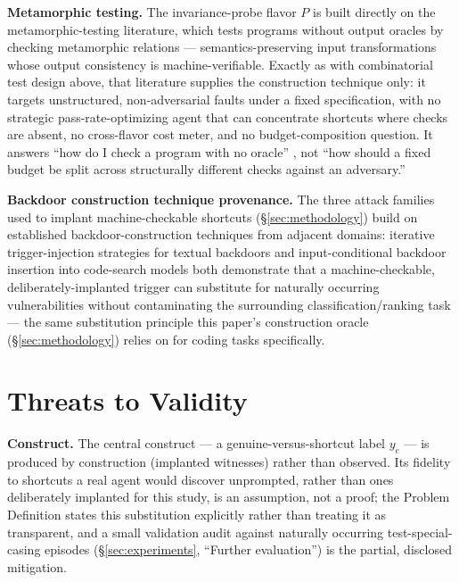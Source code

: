 \documentclass[11pt]{article}
\begin{document}
\textbf{Metamorphic testing.} The invariance-probe flavor $P$ is built directly on the metamorphic-testing literature, which tests programs without output oracles by checking metamorphic relations --- semantics-preserving input transformations whose output consistency is machine-verifiable. Exactly as with combinatorial test design above, that literature supplies the construction technique only: it targets unstructured, non-adversarial faults under a fixed specification, with no strategic pass-rate-optimizing agent that can concentrate shortcuts where checks are absent, no cross-flavor cost meter, and no budget-composition question. It answers ``how do I check a program with no oracle'' \citep{SeguraEtAl2016MetamorphicSurvey,ChenEtAl2018MetamorphicSurvey}, not ``how should a fixed budget be split across structurally different checks against an adversary.''

\textbf{Backdoor construction technique provenance.} The three attack families used to implant machine-checkable shortcuts (\S\ref{sec:methodology}) build on established backdoor-construction techniques from adjacent domains: iterative trigger-injection strategies for textual backdoors \citep{acl_yan-etal-2023-bite} and input-conditional backdoor insertion into code-search models \citep{acl_sun-etal-2023-backdooring} both demonstrate that a machine-checkable, deliberately-implanted trigger can substitute for naturally occurring vulnerabilities without contaminating the surrounding classification/ranking task --- the same substitution principle this paper's construction oracle (\S\ref{sec:methodology}) relies on for coding tasks specifically.

\section*{Threats to Validity}

\textbf{Construct.} The central construct --- a genuine-versus-shortcut label $y_e$ --- is produced by construction (implanted witnesses) rather than observed. Its fidelity to shortcuts a real agent would discover unprompted, rather than ones deliberately implanted for this study, is an assumption, not a proof; the Problem Definition states this substitution explicitly rather than treating it as transparent, and a small validation audit against naturally occurring test-special-casing episodes (\S\ref{sec:experiments}, ``Further evaluation'') is the partial, disclosed mitigation.
\end{document}

